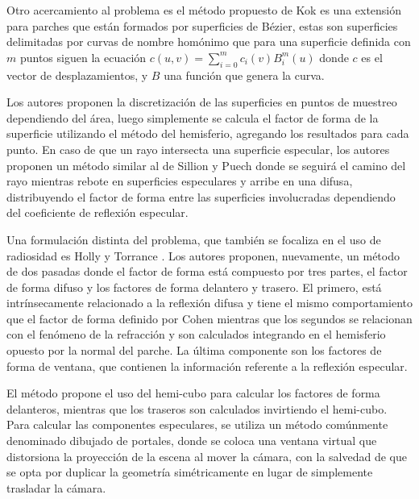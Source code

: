 Otro acercamiento al problema es el método propuesto de Kok \cite{Kok} es una extensión para parches que están formados por superficies de Bézier, estas son superficies delimitadas por curvas de nombre homónimo que para una superficie definida con $m$ puntos siguen la ecuación $c(u,v) = \sum_{i=0}^{m} c_{i}(v)B_{i}^{m}(u)$ donde $c$ es el vector de desplazamientos, y $B$ una función que genera la curva.

Los autores proponen la discretización de las superficies en puntos de muestreo dependiendo del área, luego simplemente se calcula el factor de forma de la superficie utilizando el método del hemisferio, agregando los resultados para cada punto. En caso de que un rayo intersecta una superficie especular, los autores proponen un método similar al de Sillion y Puech \cite{Sillion} donde se seguirá el camino del rayo mientras rebote en superficies especulares y arribe en una difusa, distribuyendo el factor de forma entre las superficies involucradas dependiendo del coeficiente de reflexión especular.

Una formulación distinta del problema, que también se focaliza en el uso de radiosidad es Holly y Torrance \cite{Holly}. Los autores proponen, nuevamente, un método de dos pasadas donde el factor de forma está compuesto por tres partes, el factor de forma difuso y los factores de forma delantero y trasero. El primero, está intrínsecamente relacionado a la reflexión difusa y tiene el mismo comportamiento que el factor de forma definido por Cohen \cite{Cohen} mientras que los segundos se relacionan con el fenómeno de la refracción y son calculados integrando en el hemisferio opuesto por la normal del parche. La última componente son los factores de forma de ventana, que contienen la información referente a la reflexión especular.

El método propone el uso del hemi-cubo para calcular los factores de forma delanteros, mientras que los traseros son calculados invirtiendo el hemi-cubo. Para calcular las componentes especulares, se utiliza un método comúnmente denominado dibujado de portales, donde se coloca una ventana virtual que distorsiona la proyección de la escena al mover la cámara, con la salvedad de que se opta por duplicar la geometría simétricamente en lugar de simplemente trasladar la cámara.